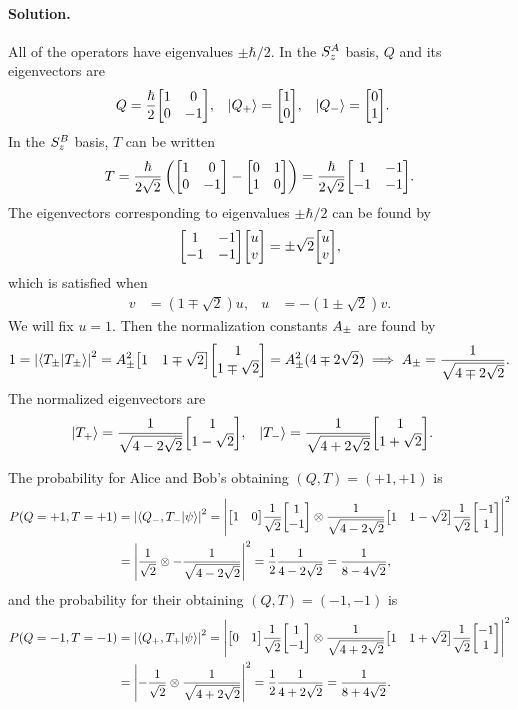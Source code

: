 \documentclass[11pt]{article}
\newcommand{\beq}{\begin{equation*}}
\newcommand{\eeq}{\end{equation*}}
\newenvironment{solution}
{
	\paragraph{Solution.}
}
{
	\bigskip
}
\begin{document}
\begin{solution}
	All of the operators have eigenvalues $\pm \hbar/2$.  In the $S_z^A$ basis, $Q$ and its eigenvectors are
	\begin{align*}
		Q &= \frac{\hbar}{2} \mqty[ 1 & 0 \\ 0 & -1 ], &
		\kQp &= \mqty[ 1 \\ 0 ], &
		\kQm &= \mqty[ 0 \\ 1 ].
	\end{align*}
	In the $S_z^B$ basis, $T$ can be written
	\beq
		T = \frac{\hbar}{2\sqrt{2}} \left( \mqty[ 1 & 0 \\ 0 & -1 ] - \mqty[ 0 & 1 \\ 1 & 0 ] \right)
		= \frac{\hbar}{2\sqrt{2}} \mqty[ 1 & -1 \\ -1 & -1 ].
	\eeq
	The eigenvectors corresponding to eigenvalues $\pm \hbar/2$ can be found by
	\beq
		\mqty[ 1 & -1 \\ -1 & -1 ] \mqty[ u \\ v ] = \pm\sqrt{2} \mqty[ u \\ v ],
	\eeq
	which is satisfied when
	\begin{align*}
		v &= (1 \mp \sqrt{2}) u, &
		u &= -(1 \pm \sqrt{2}) v.
	\end{align*}
	We will fix $u = 1$.  Then the normalization constants $A_\pm$ are found by
	\beq
		1 = \abs{\braket{T_\pm}}^2
		= \Apm^2 \mqty[ 1 & 1 \mp \sqrt{2} ] \mqty[ 1 \\ 1 \mp \sqrt{2} ]
		= \Apm^2 (4 \mp 2 \sqrt{2})
		\implies
		\Apm = \frac{1}{\sqrt{4 \mp 2 \sqrt{2}}}.
	\eeq
	The normalized eigenvectors are
	\begin{align*}
		\kTp &= \frac{1}{\sqrt{4 - 2 \sqrt{2}}} \mqty[ 1 \\ 1 - \sqrt{2} ], &
		\kTm &= \frac{1}{\sqrt{4 + 2 \sqrt{2}}} \mqty[ 1 \\ 1 + \sqrt{2} ].
	\end{align*}
	
	The probability for Alice and Bob's obtaining $(Q, T) = (+1, +1)$ is
	\begin{align*}
		P(Q=+1, T=+1) &= \abs{\braket{Q_-, T_-}{\psi}}^2
		= \abs{ \mqty[ 1 & 0 ] \frac{1}{\sqrt{2}} \mqty[ 1 \\ -1 ] \otimes \frac{1}{\sqrt{4 - 2 \sqrt{2}}} \mqty[1 & 1 - \sqrt{2} ] \frac{1}{\sqrt{2}} \mqty[ -1 \\ 1 ] }^2 \\
		&= \abs{ \frac{1}{\sqrt{2}} \otimes -\frac{1}{\sqrt{4 - 2 \sqrt{2}}} }^2
		= \frac{1}{2} \frac{1}{4 - 2 \sqrt{2}}
		= \frac{1}{8 - 4 \sqrt{2}},
	\end{align*}
	and the probability for their obtaining $(Q, T) = (-1, -1)$ is
	\begin{align*}
		P(Q=-1, T=-1) &= \abs{\braket{Q_+, T_+}{\psi}}^2
		= \abs{ \mqty[ 0 & 1 ] \frac{1}{\sqrt{2}} \mqty[ 1 \\ -1 ] \otimes \frac{1}{\sqrt{4 + 2 \sqrt{2}}} \mqty[1 & 1 + \sqrt{2} ] \frac{1}{\sqrt{2}} \mqty[ -1 \\ 1 ] }^2 \\
		&= \abs{ -\frac{1}{\sqrt{2}} \otimes \frac{1}{\sqrt{4 + 2 \sqrt{2}}} }^2
		= \frac{1}{2} \frac{1}{4 + 2 \sqrt{2}}
		= \frac{1}{8 + 4 \sqrt{2}}.
	\end{align*}
\end{solution}
\end{document}

